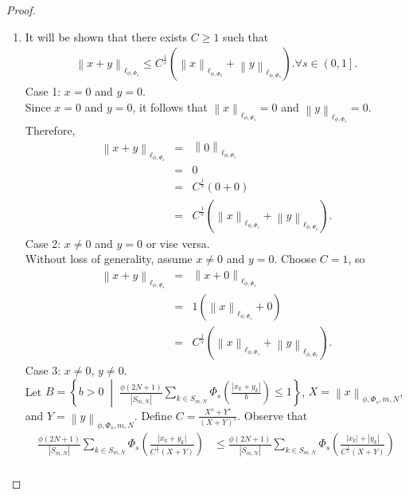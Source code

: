 \documentclass[12pt,a4paper]{article}
\theoremstyle{remark}
\begin{document}
\begin{proof}
\begin{enumerate}
        \item It will be shown that there exists $C\geq 1$ such that
        \begin{eqnarray*}
            \left\lVert x+y \right\rVert _{\ell_{\phi,\Phi_s}}\leq C^{\frac{1}{s}} \left(\left\lVert x \right\rVert _{\ell_{\phi, \Phi_s}} + \left\lVert y \right\rVert _{\ell_{\phi, \Phi_s}} \right). \forall s\in \left(0,1\right].
        \end{eqnarray*}
        Case 1: $x=0$ and $y=0$.\\
        Since $x=0$ and $y=0$, it follows that $\left\lVert x \right\rVert _{\ell_{\phi,\Phi_s}}=0$ and $\left\lVert y \right\rVert _{\ell_{\phi,\Phi_s}}=0$.
        Therefore,
        \begin{eqnarray*}
            \left\lVert x+y \right\rVert _{\ell_{\phi,\Phi_s}} &=&\left\lVert 0 \right\rVert _{\ell_{\phi,\Phi_s}}\\
            &=& 0\\
            &=& C^{\frac{1}{s}}\left(0+0\right)\\
            &=& C^{\frac{1}{s}}\left(\left\lVert x \right\rVert _{\ell_{\phi,\Phi_s}}+\left\lVert y \right\rVert _{\ell_{\phi,\Phi_s}}\right). 
        \end{eqnarray*}
        Case 2: $x\neq0$ and $y=0$ or vise versa.\\  
        Without loss of generality, assume $x\neq0$ and $y=0$. Choose $C=1$, so 
        \begin{eqnarray*}
            \left\lVert x+y \right\rVert _{\ell_{\phi,\Phi_s}} &=&\left\lVert x+0 \right\rVert _{\ell_{\phi,\Phi_s}}\\
            &=& 1\left(\left\lVert x \right\rVert _{\ell_{\phi,\Phi_s}}+0\right)\\ &=&C^{\frac{1}{s}}\left(\left\lVert x \right\rVert _{\ell_{\phi,\Phi_s}}+\left\lVert y \right\rVert _{\ell_{\phi,\Phi_s}}\right).
        \end{eqnarray*}
        Case 3: $x\neq 0$, $y\neq 0$.\\
        Let $B = \left\{b > 0 \;\middle|\; \frac{\phi\left(2N+1\right)}{\left|S_{m,N}\right|}\sum_{k\in S_{m,N}} \Phi_s \left(\frac{\left|x_k + y_k\right|}{b}\right) \leq 1\right\}$, $X=\left\lVert x \right\rVert _{\phi, \Phi_s, m, N}$, and $Y=\left\lVert y\right\rVert _{\phi, \Phi_s, m, N}$.
        Define $C = \frac{X^s + Y^s}{(X + Y)^s}$. Observe that
        \begin{eqnarray*}
            \frac{\phi\left(2N+1\right)}{\left|S_{m,N}\right|}\sum_{k\in S_{m,N}}\Phi_s\left(\frac{\left|x_k+y_k\right|}{C^{\frac{1}{s}} \left(X+Y\right)}\right) &\leq  \frac{\phi\left(2N+1\right)}{\left|S_{m,N}\right|}\sum_{k\in S_{m,N}}\Phi_s\left(\frac{\left|x_k\right|+\left|y_k\right|}{C^{\frac{1}{s}} \left(X+Y\right)}\right)\\

\end{eqnarray*}
\end{enumerate}
\end{proof}
\end{document}
